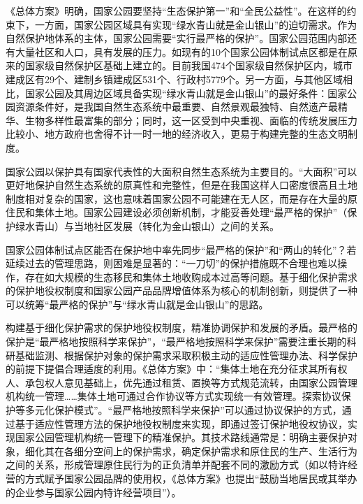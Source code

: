 \documentclass[]{book}
\begin{document}
《总体方案》明确，国家公园要坚持``生态保护第一''和``全民公益性''。在这样的约束下，一方面，国家公园区域具有实现``绿水青山就是金山银山''的迫切需求。作为自然保护地体系的主体，国家公园需要``实行最严格的保护''。国家公园范围内部还有大量社区和人口，具有发展的压力。如现有的10个国家公园体制试点区都是在原来的国家级自然保护区基础上建立的。目前我国474个国家级自然保护区内，城市建成区有29个、建制乡镇建成区531个、行政村5779个。另一方面，与其他区域相比，国家公园及其周边区域具备实现``绿水青山就是金山银山''的最好条件：国家公园资源条件好，是我国自然生态系统中最重要、自然景观最独特、自然遗产最精华、生物多样性最富集的部分；同时，这一区受到中央重视、面临的传统发展压力比较小、地方政府也舍得不计一时一地的经济收入，更易于构建完整的生态文明制度。

国家公园以保护具有国家代表性的大面积自然生态系统为主要目的。``大面积''可以更好地保护自然生态系统的原真性和完整性，但是在我国这样人口密度很高且土地制度相对复杂的国家，这也意味着国家公园不可能建在无人区，而是存在大量的原住民和集体土地。国家公园建设必须创新机制，才能妥善处理``最严格的保护''（保护绿水青山）与当地社区发展（转化为金山银山）之间的关系。

国家公园体制试点区能否在保护地中率先同步``最严格的保护''和``两山的转化''？若延续过去的管理思路，则困难是显著的：``一刀切''的保护措施既不合理也难以操作，存在如大规模的生态移民和集体土地收购成本过高等问题。基于细化保护需求的保护地役权制度和国家公园产品品牌增值体系为核心的机制创新，则提供了一种可以统筹``最严格的保护''与``绿水青山就是金山银山''的思路。

构建基于细化保护需求的保护地役权制度，精准协调保护和发展的矛盾。最严格的保护是``最严格地按照科学来保护''，``最严格地按照科学来保护''需要注重长期的科研基础监测、根据保护对象的保护需求采取积极主动的适应性管理办法、科学保护的前提下提倡合理适度的利用。《总体方案》中：``集体土地在充分征求其所有权人、承包权人意见基础上，优先通过租赁、置换等方式规范流转，由国家公园管理机构统一管理\ldots{}\ldots{}集体土地可通过合作协议等方式实现统一有效管理。探索协议保护等多元化保护模式''。``最严格地按照科学来保护''可以通过协议保护的方式，通过基于适应性管理方法的保护地役权制度来实现，即通过签订保护地役权协议，实现国家公园管理机构统一管理下的精准保护。其技术路线通常是：明确主要保护对象，细化其在各细分空间上的保护需求，确定保护需求和原住民的生产、生活行为之间的关系，形成管理原住民行为的正负清单并配套不同的激励方式（如以特许经营的方式赋予国家公园品牌的使用权，《总体方案》也提出``鼓励当地居民或其举办的企业参与国家公园内特许经营项目''）。
\end{document}
